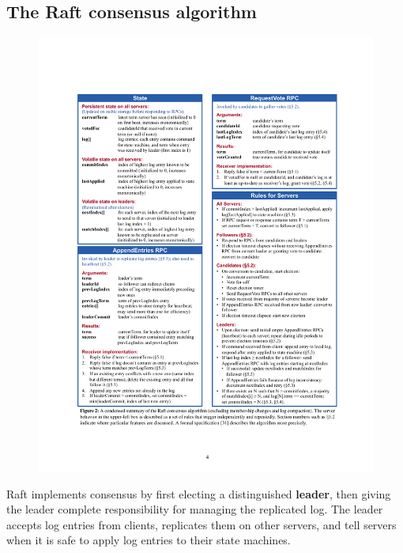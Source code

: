 \documentclass[11pt]{article}
\begin{document}
\subsection{The Raft consensus algorithm}
\label{sec:org025247c}
\begin{figure}[htbp]
\centering
\includegraphics[width=.9\linewidth]{../images/6.824/3.pdf}
\label{}
\end{figure}


Raft implements consensus by first electing a distinguished \textbf{leader}, then giving the leader
complete responsibility for managing the replicated log. The leader accepts log entries from
clients, replicates them on other servers, and tell servers when it is safe to apply log entries
to their state machines.
\end{document}
